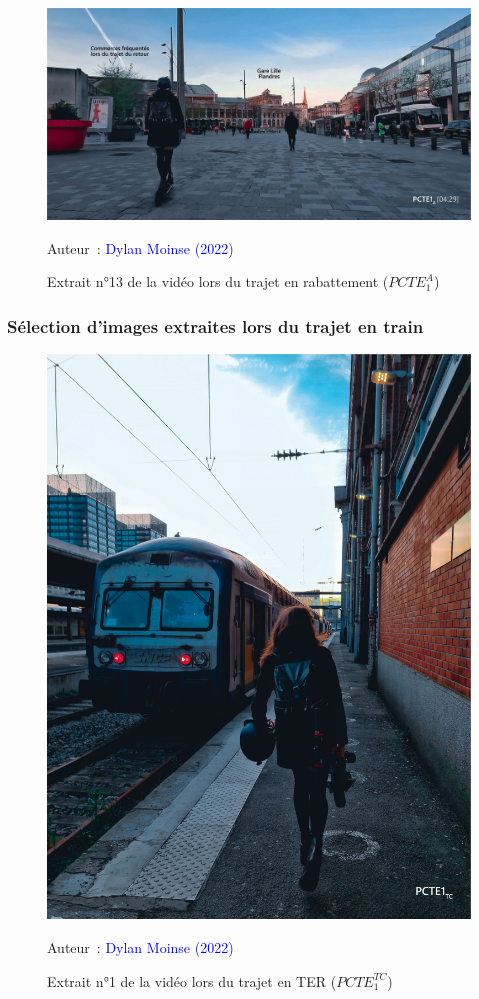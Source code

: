     \begin{figure}[h!]\vspace*{4pt}
        \caption*{Extrait n°13 de la vidéo lors du trajet en rabattement (\(PCTE^{A}_{1}\))}
        \centerline{\includegraphics[width=0.75\columnwidth]{src/Figures/Annexes/Extrait_Video_PCTE1_Access_13.jpg}}
        \vspace{5pt}
        \begin{flushright}\scriptsize{
        Auteur~: \textcolor{blue}{Dylan Moinse (2022)}
        }\end{flushright}
    \end{figure}


\subsubsection{Sélection d'images extraites lors du trajet en train}

    \begin{figure}[h!]\vspace*{4pt}
        \caption*{Extrait n°1 de la vidéo lors du trajet en TER (\(PCTE^{TC}_{1}\))}
        \centerline{\includegraphics[width=0.5\columnwidth]{src/Figures/Annexes/Extrait_Video_PCTE1_TC_1.jpg}}
        \vspace{5pt}
        \begin{flushright}\scriptsize{
        Auteur~: \textcolor{blue}{Dylan Moinse (2022)}
        }\end{flushright}
    \end{figure}

